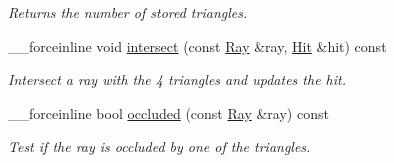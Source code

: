 \begin{DoxyCompactItemize}
\begin{DoxyCompactList}\small\item\em Returns the number of stored triangles. \item\end{DoxyCompactList}\item 
\_\-\_\-forceinline void \hyperlink{structembree_1_1_triangle4_adc295d58a225e325534905a7ac3f7160}{intersect} (const \hyperlink{structembree_1_1_ray}{Ray} \&ray, \hyperlink{structembree_1_1_hit}{Hit} \&hit) const 
\begin{DoxyCompactList}\small\item\em Intersect a ray with the 4 triangles and updates the hit. \item\end{DoxyCompactList}\item 
\_\-\_\-forceinline bool \hyperlink{structembree_1_1_triangle4_a1e3495abae507495268b44573cfa56a7}{occluded} (const \hyperlink{structembree_1_1_ray}{Ray} \&ray) const 
\begin{DoxyCompactList}\small\item\em Test if the ray is occluded by one of the triangles. \item\end{DoxyCompactList}\end{DoxyCompactItemize}
